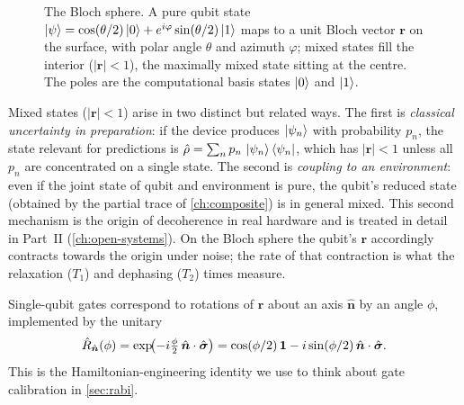 \begin{figure}[t]
  \centering
  \caption{The Bloch sphere. A pure qubit state
  $\ket{\psi}=\cos(\theta/2)\ket{0}+e^{i\varphi}\sin(\theta/2)\ket{1}$
  maps to a unit Bloch vector $\bm{r}$ on the surface, with polar angle
  $\theta$ and azimuth $\varphi$; mixed states fill the interior
  ($|\bm{r}|<1$), the maximally mixed state sitting at the centre. The
  poles are the computational basis states $\ket{0}$ and $\ket{1}$.}
  \label{fig:bloch-sphere}
\end{figure}

\begin{remark}
Mixed states ($|\bm{r}|<1$) arise in two distinct but related ways.
The first is \emph{classical uncertainty in preparation}: if the
device produces $\ket{\psi_n}$ with probability $p_n$, the state
relevant for predictions is $\hat{\rho}=\sum_n p_n\,\ket{\psi_n}\bra{\psi_n}$,
which has $|\bm{r}|<1$ unless all $p_n$ are concentrated on a
single state. The second is \emph{coupling to an environment}:
even if the joint state of qubit and environment is pure, the
qubit's reduced state (obtained by the partial trace
of \cref{ch:composite}) is in general mixed. This second mechanism
is the origin of decoherence in real hardware and is treated in
detail in Part~II (\cref{ch:open-systems}). On the Bloch sphere
the qubit's $\bm{r}$ accordingly contracts towards the origin
under noise; the rate of that contraction is what the relaxation
($T_1$) and dephasing ($T_2$) times measure.
\end{remark}

\begin{remark}
Single-qubit gates correspond to rotations of $\bm{r}$ about an axis
$\hat{\bm{n}}$ by an angle $\phi$, implemented by the unitary
\begin{equation}
\hat{R}_{\hat{\bm{n}}}(\phi) = \exp\!\bigl(-i\tfrac{\phi}{2}\,\hat{\bm{n}}\cdot\hat{\bm{\sigma}}\bigr)
= \cos(\phi/2)\,\mathbf{1} - i\sin(\phi/2)\,\hat{\bm{n}}\cdot\hat{\bm{\sigma}}.
\end{equation}
This is the Hamiltonian-engineering identity we use to think about
gate calibration in \cref{sec:rabi}.
\end{remark}

